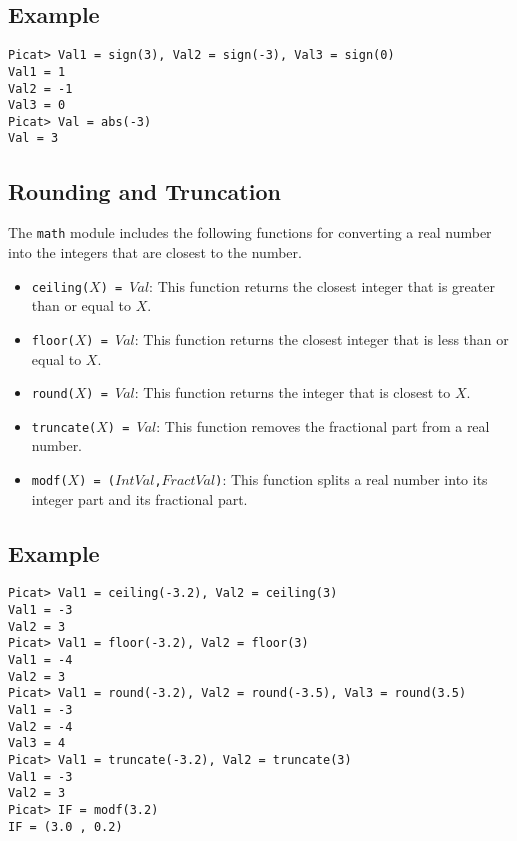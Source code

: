 \subsection*{Example}
\begin{verbatim}
Picat> Val1 = sign(3), Val2 = sign(-3), Val3 = sign(0)
Val1 = 1
Val2 = -1
Val3 = 0
Picat> Val = abs(-3)
Val = 3
\end{verbatim}

\subsection{Rounding and Truncation}
The \texttt{math} module includes the following functions for converting a real number into the integers that are closest to the number.
\begin{itemize}
\item \texttt{ceiling($X$) = $Val$}: This function returns the closest integer that is greater than or equal to $X$.
\item \texttt{floor($X$) = $Val$}: This function returns the closest integer that is less than or equal to $X$.
\item \texttt{round($X$) = $Val$}: This function returns the integer that is closest to $X$.
\item \texttt{truncate($X$) = $Val$}: This function removes the fractional part from a real number.  
\item \texttt{modf($X$) = ($IntVal$,$FractVal$)}: This function splits a real number into its integer part and its fractional part.
\end{itemize}

\subsection*{Example}
\begin{verbatim}
Picat> Val1 = ceiling(-3.2), Val2 = ceiling(3)
Val1 = -3
Val2 = 3
Picat> Val1 = floor(-3.2), Val2 = floor(3)
Val1 = -4
Val2 = 3
Picat> Val1 = round(-3.2), Val2 = round(-3.5), Val3 = round(3.5)
Val1 = -3
Val2 = -4
Val3 = 4
Picat> Val1 = truncate(-3.2), Val2 = truncate(3)
Val1 = -3
Val2 = 3
Picat> IF = modf(3.2)
IF = (3.0 , 0.2)
\end{verbatim}

